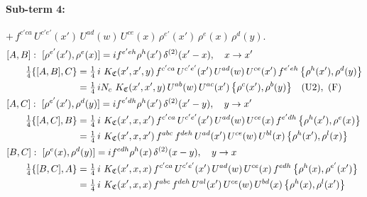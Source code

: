\documentclass[10pt]{article}
\numberwithin{equation}{section}
\begin{document}
\paragraph{Sub-term 4:} $+\,f^{c'ca}\,U^{c'e'}(x')\,U^{ad}(w)\,U^{ce}(x)\,\rho^{e'}(x')\,\rho^{e}(x)\,\rho^{d}(y)$.
\begin{align}
&[A,B]:\ [\rho^{e'}(x'),\rho^{e}(x)]=i f^{e'eh}\rho^{h}(x')\,\delta^{(2)}(x'-x),\quad x\to x'\notag\\
&\qquad \tfrac14\{[A,B],C\}=\tfrac14\,i\,\,K_{\mathfrak C}(x',x',y)\,f^{c'ca}\,U^{c'e'}(x')\,U^{ad}(w)\,U^{ce}(x')\,f^{e'eh}\,\big\{\rho^{h}(x'),\rho^{d}(y)\big\}\notag\\
&\qquad\phantom{\tfrac14\{[A,B],C\}}=\tfrac14\,i N_{c}\,\,K_{\mathfrak C}(x',x',y)\,U^{ab}(w)\,U^{ac}(x')\,\big\{\rho^{c}(x'),\rho^{b}(y)\big\}\quad\text{(U2)},\ \text{(F)}
\label{R:eq:GIII.V-4-AB}\\
&[A,C]:\ [\rho^{e'}(x'),\rho^{d}(y)]=i f^{e'dh}\rho^{h}(x')\,\delta^{(2)}(x'-y),\quad y\to x'\notag\\
&\qquad \tfrac14\{[A,C],B\}=\tfrac14\,i\,\,K_{\mathfrak C}(x',x,x')\,f^{c'ca}\,U^{c'e'}(x')\,U^{ad}(w)\,U^{ce}(x)\,f^{e'dh}\,\big\{\rho^{h}(x'),\rho^{e}(x)\big\}\notag\\
&\qquad\phantom{\tfrac14\{[A,C],B\}}=\tfrac14\,i\,\,K_{\mathfrak C}(x',x,x')\,f^{abc}\,f^{deh}\,U^{ad}(x')\,U^{ce}(w)\,U^{bl}(x)\,\big\{\rho^{h}(x'),\rho^{l}(x)\big\}
\label{R:eq:GIII.V-4-AC}\\
&[B,C]:\ [\rho^{e}(x),\rho^{d}(y)]=i f^{edh}\rho^{h}(x)\,\delta^{(2)}(x-y),\quad y\to x\notag\\
&\qquad \tfrac14\{[B,C],A\}=\tfrac14\,i\,\,K_{\mathfrak C}(x',x,x)\,f^{c'ca}\,U^{c'e'}(x')\,U^{ad}(w)\,U^{ce}(x)\,f^{edh}\,\big\{\rho^{h}(x),\rho^{e'}(x')\big\}\notag\\
&\qquad\phantom{\tfrac14\{[B,C],A\}}=\tfrac14\,i\,\,K_{\mathfrak C}(x',x,x)\,f^{abc}\,f^{deh}\,U^{al}(x')\,U^{ce}(w)\,U^{bd}(x)\,\big\{\rho^{h}(x),\rho^{l}(x')\big\}
\label{R:eq:GIII.V-4-BC}
\end{align}
\end{document}
